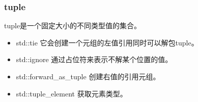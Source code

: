 \begin{frame}
  \frametitle{tuple}
  tuple是一个固定大小的不同类型值的集合。
  \begin{itemize}
    \item std::tie 它会创建一个元组的左值引用同时可以解包tuple。
    \item std::ignore 通过占位符来表示不解某个位置的值。
    \item std::forward\_as\_tuple 创建右值的引用元组。
    \item std::tuple\_element  获取元素类型。
  \end{itemize}
  
\end{frame}